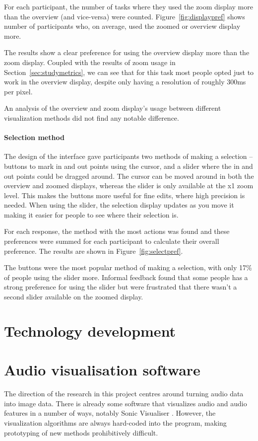 For each participant, the number of tasks where they used the zoom display more
than the overview (and vice-versa) were counted. Figure~\ref{fig:displaypref}
shows number of participants who, on average, used the zoomed or overview
display more.

The results show a clear preference for using the overview display more than
the zoom display. Coupled with the results of zoom usage in
Section~\ref{sec:studymetrics}, we can see that for this task most people opted
just to work in the overview display, despite only having a resolution of
roughly 300ms per pixel.

An analysis of the overview and zoom display's usage between different
visualization methods did not find any notable difference.

\paragraph{Selection method}
The design of the interface gave participants two methods of making a selection
-- buttons to mark in and out points using the cursor, and a slider where the
in and out points could be dragged around. The cursor can be moved around in
both the overview and zoomed displays, whereas the slider is only available at
the x1 zoom level. This makes the buttons more useful for fine edits, where
high precision is needed. When using the slider, the selection display updates
as you move it making it easier for people to see where their selection is.

For each response, the method with the most actions was found and these
preferences were summed for each participant to calculate their overall
preference. The results are shown in Figure~\ref{fig:selectpref}.

The buttons were the most popular method of making a selection, with only 17\%
of people using the slider more. Informal feedback found that some people has a
strong preference for using the slider but were frustrated that there wasn't a
second slider available on the zoomed display.

\section{Technology development}\label{sec:tech}

\section{Audio visualisation software}\label{sec:vis}
The direction of the research in this project centres around turning audio
data into image data. There is already some software that visualizes audio and
audio features in a number of ways, notably Sonic Visualiser \cite{Cannam2010}.
However, the visualization algorithms are always hard-coded into the program,
making prototyping of new methods prohibitively difficult.

